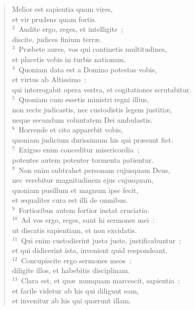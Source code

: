 \begin{flushleft}\begin{verse}\vspace{-19pt}Melior est sapientia quam vires,\\ et vir prudens quam fortis.\\
${}^{2}$~Audite ergo, reges, et intelligite~;\\ discite, judices finium terr\ae .\\
${}^{3}$~Pr\ae bete aures, vos qui continetis multitudines,\\ et placetis vobis in turbis nationum.\\
${}^{4}$~Quoniam data est a Domino potestas vobis,\\ et virtus ab Altissimo~:\\ qui interrogabit opera vestra, et cogitationes scrutabitur.\\
${}^{5}$~Quoniam cum essetis ministri regni illius,\\ non recte judicastis, nec custodistis legem justiti\ae ,\\ neque secundum voluntatem Dei ambulastis.\\
${}^{6}$~Horrende et cito apparebit vobis,\\ quoniam judicium durissimum his qui pr\ae sunt fiet.\\
${}^{7}$~Exiguo enim conceditur misericordia~;\\ potentes autem potenter tormenta patientur.\\
${}^{8}$~Non enim subtrahet personam cujusquam Deus,\\ nec verebitur magnitudinem ejus cujusquam,\\ quoniam pusillum et magnum ipse fecit,\\ et \ae qualiter cura est illi de omnibus.\\
${}^{9}$~Fortioribus autem fortior instat cruciatio.\\
${}^{10}$~Ad vos ergo, reges, sunt hi sermones mei~:\\ ut discatis sapientiam, et non excidatis.\\
${}^{11}$~Qui enim custodierint justa juste, justificabuntur~;\\ et qui didicerint ista, invenient quid respondeant.\\
${}^{12}$~Concupiscite ergo sermones meos~;\\ diligite illos, et habebitis disciplinam.\\
${}^{13}$~Clara est, et qu\ae\ numquam marcescit, sapientia~:\\ et facile videtur ab his qui diligunt eam,\\ et invenitur ab his qui qu\ae runt illam.\\

\end{verse}
\end{flushleft}
